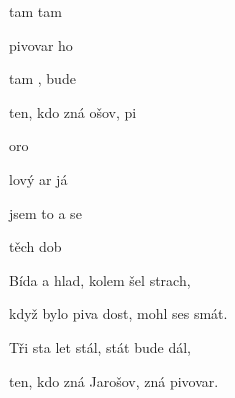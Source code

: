 

\zs
{} tam   tam 

pivovar   ho 

 tam ,  bude 

ten, kdo zná ošov,  pi
\ks

\zr
{}   oro

lový ar já 

 jsem to  a  se 

 těch dob  
\kr

\zs
Bída a hlad, kolem šel strach,

když bylo piva dost, mohl ses smát.

Tři sta let stál, stát bude dál,

ten, kdo zná Jarošov, zná pivovar.
\ks

\zr \kr


\kp


